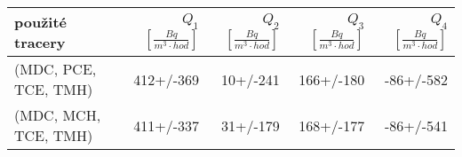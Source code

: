 \begin{tabular}{lrrrr}
\toprule
použité tracery & $Q_1$ $\left[\si{\frac{Bq}{m^3\cdot hod}}\right]$ & $Q_2$ $\left[\si{\frac{Bq}{m^3\cdot hod}}\right]$ & $Q_3$ $\left[\si{\frac{Bq}{m^3\cdot hod}}\right]$ & $Q_4$ $\left[\si{\frac{Bq}{m^3\cdot hod}}\right]$ \\
\midrule
(MDC, PCE, TCE, TMH) &                                         412+/-369 &                                          10+/-241 &                                         166+/-180 &                                         -86+/-582 \\
(MDC, MCH, TCE, TMH) &                                         411+/-337 &                                          31+/-179 &                                         168+/-177 &                                         -86+/-541 \\
\bottomrule
\end{tabular}
